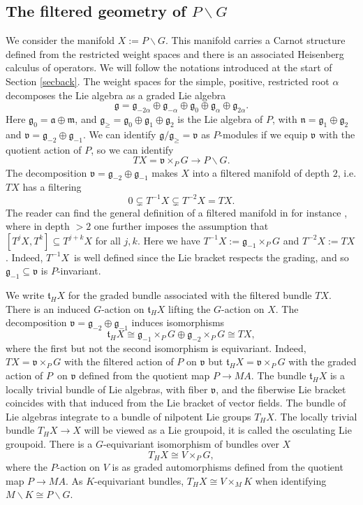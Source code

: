 \documentclass[a4paper,reqno]{amsart}
\numberwithin{equation}{section}
\theoremstyle{definition}
\theoremstyle{remark}
\begin{document}
\subsection{The filtered geometry of $P\backslash G$}
\label{subsecfiltered}
We consider the manifold $X:=P\backslash G$. This manifold carries a Carnot structure defined from the restricted weight spaces and there is an associated Heisenberg calculus of operators. We will follow the notations introduced at the start of Section \ref{secback}. The weight spaces for the simple, positive, restricted root $\alpha$ decomposes the Lie algebra as a graded Lie algebra
$$\mathfrak{g}=\mathfrak{g}_{-2\alpha}\oplus \mathfrak{g}_{-\alpha}\oplus \mathfrak{g}_0\oplus \mathfrak{g}_\alpha\oplus \mathfrak{g}_{2\alpha}.$$
Here $\mathfrak{g}_0=\mathfrak{a}\oplus \mathfrak{m}$, and $\mathfrak{g}_\geq=\mathfrak{g}_0\oplus \mathfrak{g}_1\oplus \mathfrak{g}_2$ is the Lie algebra of $P$, with $\mathfrak{n}=\mathfrak{g}_1\oplus \mathfrak{g}_2$ and $\mathfrak{v}=\mathfrak{g}_{-2}\oplus \mathfrak{g}_{-1}$. We can identify $\mathfrak{g}/\mathfrak{g}_\geq =\mathfrak{v}$ as $P$-modules if we equip $\mathfrak{v}$ with the quotient action of $P$, so we can identify 
$$TX=\mathfrak{v}\times_P G\to P\backslash G.$$
The decomposition $\mathfrak{v}=\mathfrak{g}_{-2}\oplus \mathfrak{g}_{-1}$ makes $X$ into a filtered manifold of depth $2$, i.e. $TX$ has a filtering 
$$0\subsetneq T^{-1}X\subsetneq T^{-2}X=TX.$$
The reader can find the general definition of a filtered manifold in for instance \cite{Dave_Haller1,ewertfixed,goffkuz,vanerpyunck}, where in depth $>2$ one further imposes the assumption that $[T^jX,T^k]\subseteq T^{j+k}X$ for all $j,k$. Here we have $T^{-1}X:= \mathfrak{g}_{-1}\times_P G$ and $T^{-2}X:=TX$. Indeed, $T^{-1}X$ is well defined since the Lie bracket respects the grading, and so $\mathfrak{g}_{-1}\subseteq \mathfrak{v}$ is $P$-invariant. 

We write $\mathfrak{t}_HX$ for the graded bundle associated with the filtered bundle $TX$. There is an induced $G$-action on $\mathfrak{t}_HX$ lifting the $G$-action on $X$. The decomposition $\mathfrak{v}=\mathfrak{g}_{-2}\oplus \mathfrak{g}_{-1}$ induces isomorphisms 
$$\mathfrak{t}_HX\cong \mathfrak{g}_{-1}\times_P G\oplus \mathfrak{g}_{-2}\times_P G\cong TX,$$
where the first but not the second isomorphism is equivariant. Indeed, $TX=\mathfrak{v}\times_P G$ with the filtered action of $P$ on $\mathfrak{v}$ but $\mathfrak{t}_HX=\mathfrak{v}\times_P G$ with the graded action of $P$ on $\mathfrak{v}$ defined from the quotient map $P\to MA$. The bundle  $\mathfrak{t}_HX$ is a locally trivial bundle of Lie algebras, with fiber $\mathfrak{v}$, and the fiberwise Lie bracket coincides with that induced from the Lie bracket of vector fields. The bundle of Lie algebras integrate to a bundle of nilpotent Lie groups $T_HX$. The locally trivial bundle $T_HX\to X$ will be viewed as a Lie groupoid, it is called the osculating Lie groupoid. There is a $G$-equivariant isomorphism of bundles over $X$
$$T_HX\cong V\times_PG,$$
where the $P$-action on $V$ is as graded automorphisms defined from the quotient map $P\to MA$. As $K$-equivariant bundles, $T_HX\cong V\times_MK$ when identifying $M\backslash K\cong P\backslash G$. \\
\end{document}
